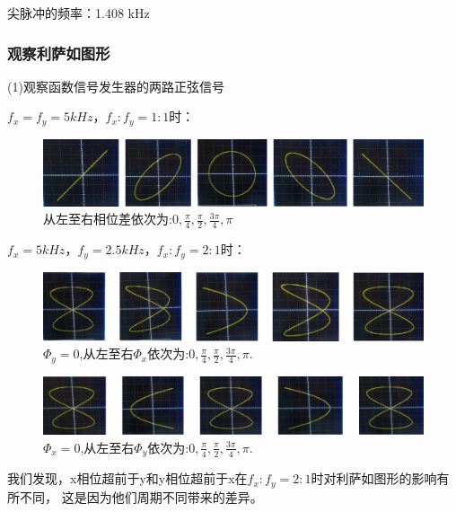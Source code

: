 \documentclass[UTF8]{ctexart}
\begin{document}
尖脉冲的频率：1.408 kHz




\subsubsection{观察利萨如图形}

\noindent (1)观察函数信号发生器的两路正弦信号

$f_x=f_y=5kHz$，$f_x:f_y=1:1$时：

\begin{figure}[h]
    \centering
    \includegraphics[scale=0.8]{1：1的图像.png}
    \caption{从左至右相位差依次为:$0,\frac{\pi}{4},\frac{\pi}{2},\frac{3\pi}{4},\pi$}
    \label{fig:label}
\end{figure}

$f_x=5kHz，f_y=2.5kHz$，$f_x:f_y=2:1$时：
\begin{figure}[h]
    \centering
    \includegraphics[scale=0.6]{2：1.png}
    \caption{$\Phi_y =0$,从左至右$\Phi_x$依次为:$0,\frac{\pi}{4},\frac{\pi}{2},\frac{3\pi}{4},\pi$.}
    \label{fig:label}
\end{figure}

\begin{figure}[h]
    \centering
    \includegraphics[scale=0.62]{2：1第二种.png}
    \caption{$\Phi_x =0$,从左至右$\Phi_y$依次为:$0,\frac{\pi}{4},\frac{\pi}{2},\frac{3\pi}{4},\pi$.}
    \label{fig:label}
\end{figure}

我们发现，x相位超前于y和y相位超前于x在$f_x:f_y=2:1$时对利萨如图形的影响有所不同，
这是因为他们周期不同带来的差异。
\\
\\
\end{document}
